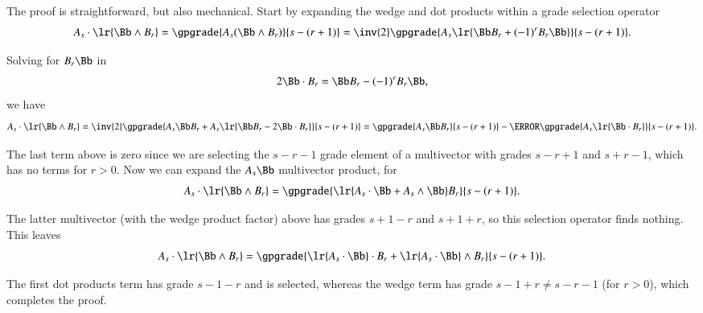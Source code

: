 %
%
The proof is straightforward, but also mechanical.
Start by expanding the wedge and dot products within a grade selection operator
\begin{dmath}\label{eqn:wedgeDistributionIdentityProblemsWedgeDistributionIdentityProof:1460}
A_s \cdot \lr{ \Bb \wedge B_r }
=
\gpgrade{A_s (\Bb \wedge B_r)}{s - (r + 1)}
=
\inv{2} \gpgrade{A_s \lr{\Bb B_r + (-1)^{r} B_r \Bb} }{s - (r + 1)}.
\end{dmath}

Solving for \(B_r \Bb\) in
\begin{dmath}\label{eqn:wedgeDistributionIdentityProblemsWedgeDistributionIdentityProof:1480}
2 \Bb \cdot B_r = \Bb B_r - (-1)^{r} B_r \Bb,
\end{dmath}
we have
\begin{dmath}\label{eqn:wedgeDistributionIdentityProblemsWedgeDistributionIdentityProof:1500}
A_s \cdot \lr{ \Bb \wedge B_r }
=
\inv{2} \gpgrade{ A_s \Bb B_r + A_s \lr{ \Bb B_r - 2 \Bb \cdot B_r } }{s - (r + 1)}
=
\gpgrade{ A_s \Bb B_r }{s - (r + 1)}
-
\cancel{\gpgrade{ A_s \lr{ \Bb \cdot B_r } }{s - (r + 1)}}.
\end{dmath}

The last term above is zero since we are selecting the \(s - r - 1\) grade element of a multivector with grades \(s - r + 1\) and \(s + r - 1\), which has no terms for \(r > 0\).
Now we can expand the \(A_s \Bb\) multivector product, for
\begin{dmath}\label{eqn:wedgeDistributionIdentityProblemsWedgeDistributionIdentityProof:1520}
A_s \cdot \lr{ \Bb \wedge B_r }
=
\gpgrade{ \lr{ A_s \cdot \Bb + A_s \wedge \Bb} B_r }{s - (r + 1)}.
\end{dmath}

The latter multivector (with the wedge product factor) above has grades \(s + 1 - r\) and \(s + 1 + r\), so this selection operator finds nothing.
This leaves
\begin{dmath}\label{eqn:wedgeDistributionIdentityProblemsWedgeDistributionIdentityProof:1540}
A_s \cdot \lr{ \Bb \wedge B_r }
=
\gpgrade{
\lr{ A_s \cdot \Bb } \cdot B_r
+ \lr{ A_s \cdot \Bb } \wedge B_r
}{s - (r + 1)}.
\end{dmath}

The first dot products term has grade \(s - 1 - r\) and is selected, whereas the wedge term has grade \(s - 1 + r \ne s - r - 1\) (for \(r > 0\)), which completes the proof.


